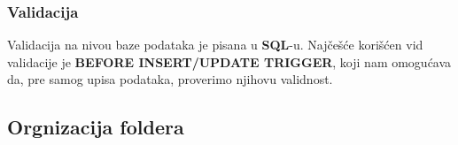\subsubsection*{Validacija}
\par Validacija na nivou baze podataka je pisana u \textbf{SQL}-u. Najčešće korišćen
vid validacije je \textbf{BEFORE INSERT/UPDATE TRIGGER}, koji nam omogućava da, pre samog upisa podataka, proverimo njihovu validnost.
\subsection{Orgnizacija foldera}